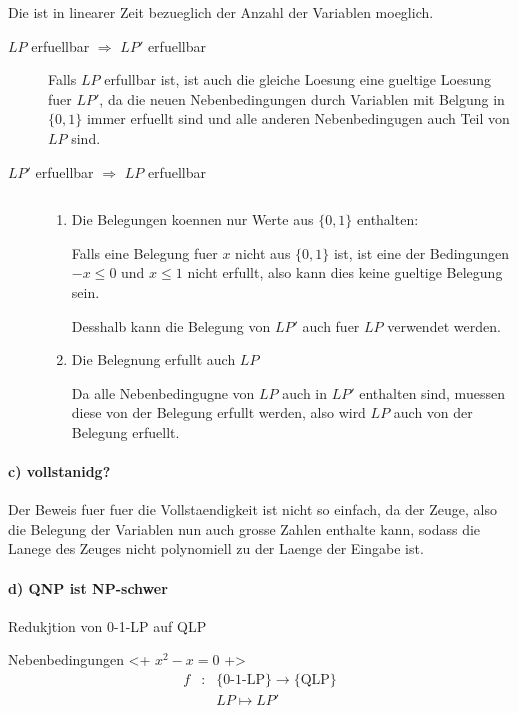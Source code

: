 Die ist in linearer Zeit bezueglich der Anzahl der Variablen moeglich.
\begin{description}
\item[$LP$ erfuellbar $\Rightarrow$ $LP'$ erfuellbar]
Falls $LP$ erfullbar ist, ist auch die gleiche Loesung eine gueltige Loesung fuer $LP'$,
da die neuen Nebenbedingungen durch Variablen mit Belgung in $\{0,1\}$ immer erfuellt sind
und alle anderen Nebenbedingugen auch Teil von $LP$ sind.

\item[$LP'$ erfuellbar $\Rightarrow$ $LP$ erfuellbar] $ $

\begin{enumerate}
\item Die Belegungen koennen nur Werte aus $\{0,1\}$ enthalten:

    Falls eine Belegung fuer $x$ nicht aus $\{0,1\}$ ist,
    ist eine der Bedingungen $-x \leq 0$ und $x \leq 1$ nicht erfullt,
    also kann dies keine gueltige Belegung sein.

    Desshalb kann die Belegung von $LP'$ auch fuer $LP$ verwendet werden.

\item Die Belegnung erfullt auch $LP$

    Da alle Nebenbedingugne von $LP$ auch in $LP'$ enthalten sind,
    muessen diese von der Belegung erfullt werden, also wird $LP$ auch von der Belegung erfuellt.

\end{enumerate}

\end{description}

\paragraph{c) vollstanidg?} 
Der Beweis fuer fuer die Vollstaendigkeit ist nicht so einfach, 
da der Zeuge, also die Belegung der Variablen nun auch grosse Zahlen enthalte
kann, sodass die Lanege des Zeuges nicht polynomiell zu der Laenge der 
Eingabe ist.

\paragraph{d) QNP ist NP-schwer} Redukjtion von 0-1-LP auf QLP

Nebenbedingungen <+ $x^2 - x = 0$ +>
\begin{eqnarray}
f &:& \{\text{0-1-LP}\} \to \{\text{QLP}\} \\
  && LP \mapsto LP'
\end{eqnarray}

